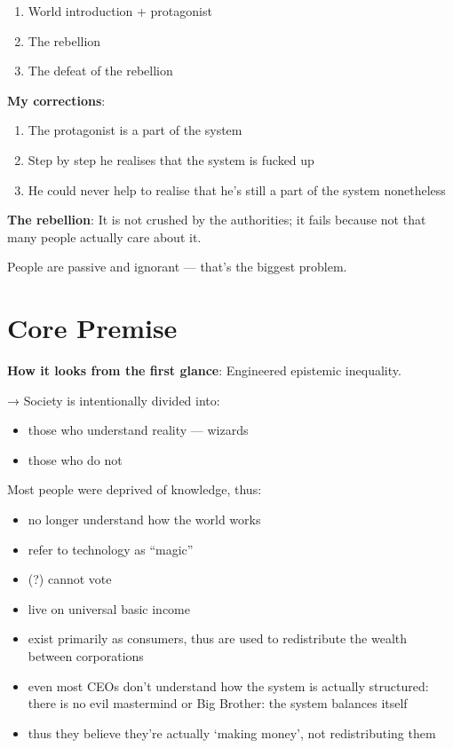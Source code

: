 \documentclass[12pt]{article}
\begin{document}
\begin{enumerate}[label=\Roman*.]
  \item World introduction + protagonist
  \item The rebellion
  \item The defeat of the rebellion
\end{enumerate}

\textbf{My corrections}:
\begin{enumerate}[label=\Roman*.]
  \item The protagonist is a part of the system
  \item Step by step he realises that the system is fucked up
  \item He could never help to realise that he’s still a part of the system nonetheless
\end{enumerate}

\textbf{The rebellion}: It is not crushed by the authorities; it fails because not that many people actually care about it.

People are passive and ignorant — that’s the biggest problem.

\section{Core Premise}

\textbf{How it looks from the first glance}: Engineered epistemic inequality.

→ Society is intentionally divided into:
\begin{itemize}
  \item those who understand reality — wizards
  \item those who do not
\end{itemize}

Most people were deprived of knowledge, thus:
\begin{itemize}
  \item no longer understand how the world works
  \item refer to technology as “magic”
  \item (?) cannot vote
  \item live on universal basic income
  \item exist primarily as consumers, thus are used to redistribute the wealth between corporations
  \item even most CEOs don't understand how the system is actually structured: there is no evil mastermind or Big Brother: the system balances itself
  \item thus they believe they're actually `making money', not redistributing them
\end{itemize}
\end{document}
